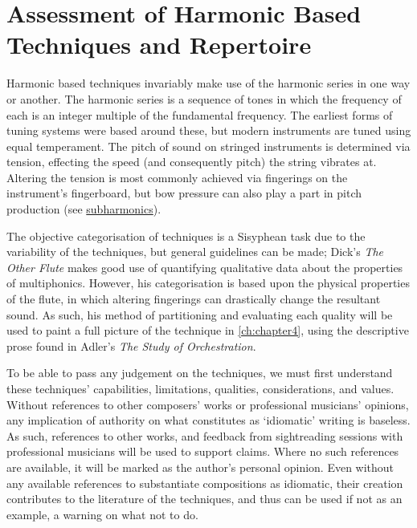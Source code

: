 
\chapter{Assessment of Harmonic Based Techniques and Repertoire}\label{ch:chapter2}



Harmonic based techniques invariably make use of the harmonic series in one way or another. 
The harmonic series is a sequence of tones in which the frequency of each is an integer multiple of the fundamental frequency. 
The earliest forms of tuning systems were based around these, but modern instruments are tuned using equal temperament. 
The pitch of sound on stringed instruments is determined via tension, effecting the speed (and consequently pitch) the string vibrates at. 
Altering the tension is most commonly achieved via fingerings on the instrument's fingerboard, but bow pressure can also play a part in pitch production (see \hyperref[sec:subharmonics]{subharmonics}).

The objective categorisation of techniques is a Sisyphean task due to the variability of the techniques, but general guidelines can be made; Dick's \emph{The Other Flute} makes good use of quantifying qualitative data about the properties of multiphonics.\autocite[84]{dickOtherFlute1989}
However, his categorisation is based upon the physical properties of the flute, in which altering fingerings can drastically change the resultant sound.
As such, his method of partitioning and evaluating each quality will be used to paint a full picture of the technique in \autoref{ch:chapter4}, using the descriptive prose found in Adler's \emph{The Study of Orchestration}.\autocite[]{adlerStudyOrchestration2002}


To be able to pass any judgement on the techniques, we must first understand these techniques' capabilities, limitations, qualities, considerations, and values. 
Without references to other composers' works or professional musicians' opinions, any implication of authority on what constitutes as `idiomatic' writing is baseless. 
As such, references to other works, and feedback from sightreading sessions with professional musicians will be used to support claims. 
Where no such references are available, it will be marked as the author's personal opinion. 
Even without any available references to substantiate compositions as idiomatic, their creation contributes to the literature of the techniques, and thus can be used if not as an example, a warning on what not to do. 

